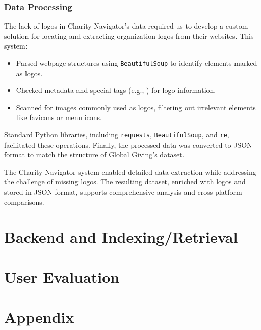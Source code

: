 \documentclass[unicode,9pt,a4paper,oneside,numbers=endperiod,openany]{scrartcl}
\begin{document}
\subsubsection{Data Processing}
The lack of logos in Charity Navigator's data required us to develop a custom solution for locating and extracting organization logos from their websites. This system:
\begin{itemize}
\item Parsed webpage structures using \texttt{BeautifulSoup} to identify elements marked as logos.
\item Checked metadata and special tags (e.g., \texttt{}) for logo information.
\item Scanned for images commonly used as logos, filtering out irrelevant elements like favicons or menu icons.
\end{itemize}
Standard Python libraries, including \texttt{requests}, \texttt{BeautifulSoup}, and \texttt{re}, facilitated these operations. Finally, the processed data was converted to JSON format to match the structure of Global Giving's dataset.

The Charity Navigator system enabled detailed data extraction while addressing the challenge of missing logos. The resulting dataset, enriched with logos and stored in JSON format, supports comprehensive analysis and cross-platform comparisons.


\section{Backend and Indexing/Retrieval}

\section{User Evaluation}

\section{Appendix}
\end{document}
